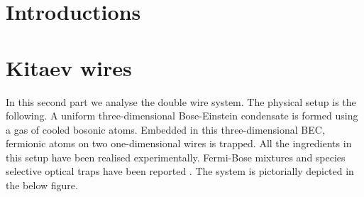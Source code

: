 \documentclass[11pt, twoside]{Thesis}
\begin{document}




\tableofcontents %




\mainmatter %

\pagestyle{fancy} %



\part{Introductions}
\newpage


 

\part{Kitaev wires}
In this second part we analyse the double wire system. The physical setup is the following. A uniform three-dimensional Bose-Einstein condensate is formed using a gas of cooled bosonic atoms. Embedded in this three-dimensional BEC, fermionic atoms on two one-dimensional wires is trapped. All the ingredients in this setup have been realised experimentally. Fermi-Bose mixtures and species selective optical traps have been reported \cite{Lamporesi.MixedDimensions, McKay.MixedTrapping, Jotzu.SpeciesSelectiveTrap}. The system is pictorially depicted in the below figure.
\end{document}
